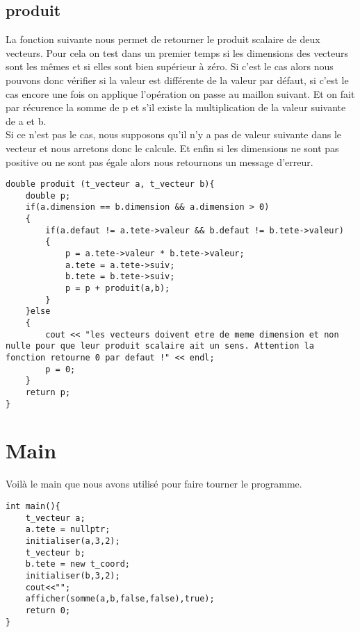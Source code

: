 \documentclass[a4paper,11pt,final]{article}
\begin{document}
\subsection{produit}
La fonction suivante nous permet de retourner le produit scalaire de deux vecteurs. Pour cela on test dans un premier temps si les dimensions des vecteurs sont les mêmes et si elles sont bien supérieur à zéro. Si c'est le cas alors nous pouvons donc vérifier si la valeur est différente de la valeur par défaut, si c'est le cas encore une fois on applique l'opération on passe au maillon suivant. Et on fait par récurence la somme de p et s'il existe la multiplication de la valeur suivante de a et b.\\
Si ce n'est pas le cas, nous supposons qu'il n'y a pas de valeur suivante dans le vecteur et nous arretons donc le calcule. Et enfin si les dimensions ne sont pas positive ou ne sont pas égale alors nous retournons un message d'erreur. 
\begin{verbatim}
double produit (t_vecteur a, t_vecteur b){
    double p;
    if(a.dimension == b.dimension && a.dimension > 0)
    {
        if(a.defaut != a.tete->valeur && b.defaut != b.tete->valeur)
        {
            p = a.tete->valeur * b.tete->valeur;
            a.tete = a.tete->suiv;
            b.tete = b.tete->suiv;
            p = p + produit(a,b);
        }
    }else
    {
        cout << "les vecteurs doivent etre de meme dimension et non nulle pour que leur produit scalaire ait un sens. Attention la fonction retourne 0 par defaut !" << endl;
        p = 0;
    }
    return p;
}
\end{verbatim}

\section{Main}
Voilà le main que nous avons utilisé pour faire tourner le programme. 
\begin{verbatim}
int main(){
    t_vecteur a;
    a.tete = nullptr;
    initialiser(a,3,2);
    t_vecteur b;
    b.tete = new t_coord;
    initialiser(b,3,2);
    cout<<"";
    afficher(somme(a,b,false,false),true);
    return 0;
}
\end{verbatim}
\end{document}
